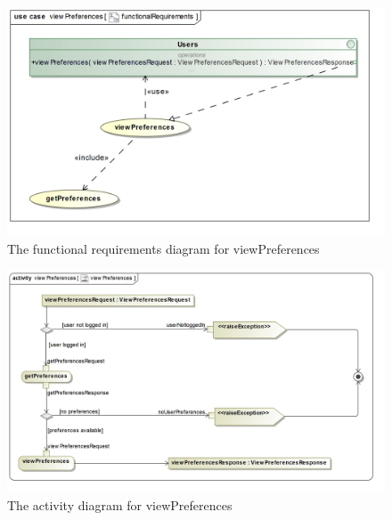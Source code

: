 \begin{figure}[H]
	\centering
	\includegraphics[width=1.1\textwidth]{../images/funcReq/viewPreferencesFunctionalRequirements.jpg}
	\caption{The functional requirements diagram for viewPreferences \label{overflow}}
\end{figure}

\begin{figure}[H]
	\centering
	\includegraphics[scale=0.22]{../images/funcReq/viewPreferencesActivityDiagram.jpg}
	\caption{The activity diagram for viewPreferences \label{overflow}}
\end{figure}